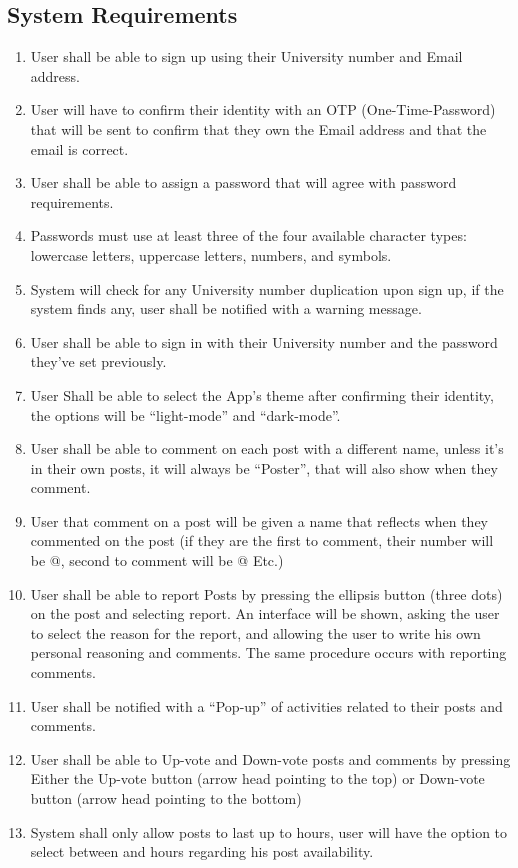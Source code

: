 \documentclass[12pt]{article}
\begin{document}
\subsection{System Requirements}
\begin{enumerate}
\item User shall be able to sign up using their University number and Email address.
\item User will have to confirm their identity with an OTP (One-Time-Password) that will be sent to confirm that they own the Email address and that the email is correct.
\item User shall be able to assign a password that will agree with password requirements.
\item Passwords must use at least three of the four available character types: lowercase letters, uppercase letters, numbers, and symbols.
\item System will check for any University number duplication upon sign up, if the system finds any, user shall be notified with a warning message.
\item User shall be able to sign in with their University number and the password they've set previously.
\item User Shall be able to select the App’s theme after confirming their identity, the options will be “light-mode” and “dark-mode”.
\item User shall be able to comment on each post with a different name, unless it’s in their own posts, it will always be “Poster”, that will also show when they comment.
\item User that comment on a post will be given a name that reflects when they commented on the post (if they are the first to comment, their number will be @, second to comment will be @ Etc.)
\item User shall be able to report Posts by pressing the ellipsis button (three dots) on the post and selecting report. An interface will be shown, asking the user to select the reason for the report, and allowing the user to write his own personal reasoning and comments. The same procedure occurs with reporting comments.
\item User shall be notified with a “Pop-up” of activities related to their posts and comments.
\item User shall be able to Up-vote and Down-vote posts and comments by pressing Either the Up-vote button (arrow head pointing to the top) or Down-vote button (arrow head pointing to the bottom)
\item System shall only allow posts to last up to hours, user will have the option to select between and hours regarding his post availability.

\end{enumerate}
\end{document}

